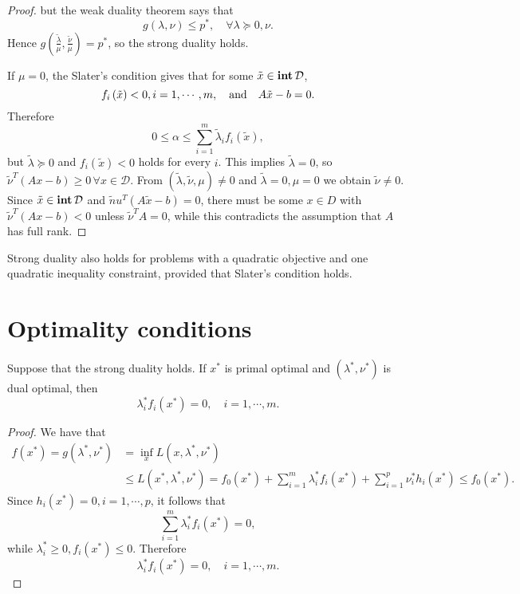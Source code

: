\documentclass[12pt]{article}
\begin{document}
\begin{proof}
    but the weak duality theorem says that
    \[g(\lambda,\nu)\leqslant p^\ast,\quad\forall\lambda\succeq0,\nu.\]
    Hence \(g\left(\frac{\tilde\lambda}{\mu},\frac{\tilde\nu}{\mu}\right)=p^\ast\), so the strong duality holds.\par
    If \(\mu=0\), the Slater's condition gives that for some \(\tilde x\in\operatorname{\mathbf{int}}\mathcal D\),
    \[f_i\left(\tilde x\right)<0,i=1,\cdots,m,\quad\textnormal{and}\quad A\tilde x-b=0.\]
    Therefore
    \[0\leqslant\alpha\leqslant\sum_{i=1}^m\tilde\lambda_if_i\left(\tilde x\right),\]
    but \(\tilde\lambda\succeq0\) and \(f_i\left(\tilde x\right)<0\) holds for every \(i\). This implies \(\tilde\lambda=0\), so \(\tilde\nu^T(Ax-b)\geqslant 0\,\forall x\in\mathcal D\). From \((\tilde\lambda,\tilde\nu,\mu)\neq 0\) and \(\tilde\lambda=0,\mu=0\) we obtain \(\tilde\nu\neq0\). Since \(\tilde x\in\operatorname{\mathbf{int}}\mathcal D\) and \(\tilde nu^T(A\tilde x-b)=0\), there must be some \(x\in D\) with \(\tilde\nu^T(Ax-b)<0\) unless \(\tilde\nu^T A=0\), while this contradicts the assumption that \(A\) has full rank.
\end{proof}

\begin{theorem}
    Strong duality also holds for problems with a quadratic objective and one quadratic inequality constraint, provided that Slater's condition holds.
\end{theorem}

\section{Optimality conditions}

\begin{theorem}
    Suppose that the strong duality holds. If \(x^\ast\) is primal optimal and \((\lambda^\ast,\nu^\ast)\) is dual optimal, then
    \[\lambda^\ast_if_i(x^\ast)=0,\quad i=1,\cdots,m.\]
\end{theorem}
\begin{proof}
    We have that
    \[\begin{aligned}
        f(x^\ast)
        = g(\lambda^\ast,\nu^\ast)
        &= \inf_x L(x,\lambda^\ast,\nu^\ast)\\
        &\leqslant L(x^\ast,\lambda^\ast,\nu^\ast)
        =f_0(x^\ast)+\sum_{i=1}^m\lambda^\ast_if_i(x^\ast)+\sum_{i=1}^p\nu^\ast_ih_i(x^\ast)
        \leqslant f_0(x^\ast).
    \end{aligned}\]
    Since \(h_i(x^\ast)=0,i=1,\cdots,p\), it follows that
    \[\sum_{i=1}^m\lambda^\ast_if_i(x^\ast)=0,\]
    while \(\lambda^\ast_i\geqslant 0,f_i(x^\ast)\leqslant 0\). Therefore
    \[\lambda^\ast_if_i(x^\ast)=0,\quad i=1,\cdots,m.\]
\end{proof}
\end{document}
